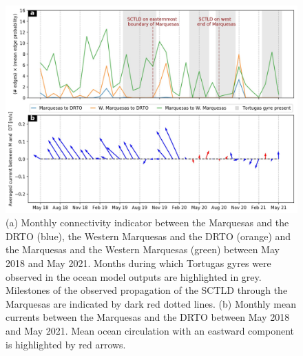 \begin{figure}
    \centering
    \includegraphics[width=.99\textwidth]{chapters/drto/figures/fig2.jpg}
    \caption{(a) Monthly connectivity indicator between the Marquesas and the DRTO (blue), the Western Marquesas and the DRTO (orange) and the Marquesas and the Western Marquesas (green) between May 2018 and May 2021. Months during which Tortugas gyres were observed in the ocean model outputs are highlighted in grey. Milestones of the observed propagation of the SCTLD through the Marquesas are indicated by dark red dotted lines. (b) Monthly mean currents between the Marquesas and the DRTO between May 2018 and May 2021. Mean ocean circulation with an eastward component is highlighted by red arrows.}
    \label{fig:fig2_drto}
\end{figure}

